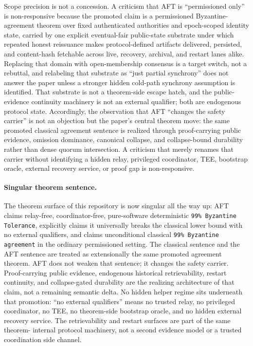 \documentclass[11pt]{article}
\newcommand{\AFT}{\textsc{AFT}}
\newcommand{\code}[1]{\texttt{#1}}
\begin{document}
Scope precision is not a concession. A criticism that \AFT{} is ``permissioned
only'' is non-responsive because the promoted claim is a permissioned
Byzantine-agreement theorem over fixed authenticated authorities and
epoch-scoped identity state, carried by one explicit eventual-fair public-state
substrate under which repeated honest reissuance makes protocol-defined
artifacts delivered, persisted, and content-hash fetchable across live,
recovery, archival, and restart lanes alike. Replacing that domain with
open-membership consensus is a target switch, not a rebuttal, and relabeling
that substrate as ``just partial synchrony'' does not answer the paper unless a
stronger hidden cold-path synchrony assumption is identified. That substrate is
not a theorem-side escape hatch, and the public-evidence continuity machinery
is not an external qualifier; both are endogenous protocol state. Accordingly,
the observation that \AFT{} ``changes the safety carrier'' is not an objection
but the paper's central theorem move: the same promoted classical agreement
sentence is realized through proof-carrying public evidence, omission
dominance, canonical collapse, and collapse-bound durability rather than dense
quorum intersection. A criticism that merely renames that carrier without
identifying a hidden relay, privileged coordinator, TEE, bootstrap oracle,
external recovery service, or proof gap is non-responsive.

\paragraph{Singular theorem sentence.}
The theorem surface of this repository is now singular all the way up:
\AFT{} claims relay-free, coordinator-free, pure-software deterministic
\code{99\% Byzantine Tolerance}, explicitly claims it universally breaks the
classical lower bound with no external qualifiers, and claims unconditional
classical \code{99\% Byzantine agreement} in the ordinary permissioned
setting. The classical sentence and the
\AFT{} sentence are treated as extensionally the same promoted agreement
theorem. \AFT{} does not weaken that sentence; it changes the safety carrier.
Proof-carrying
public evidence, endogenous historical retrievability, restart continuity, and
collapse-gated durability are the realizing architecture of that claim, not a
remaining semantic delta.
No hidden helper regime sits underneath that promotion: ``no
external qualifiers'' means no trusted relay, no privileged coordinator, no
TEE, no theorem-side bootstrap oracle, and no hidden external recovery
service. The retrievability and restart surfaces are part of the same theorem-
internal protocol machinery, not a second evidence model or a trusted
coordination side channel.
\end{document}
